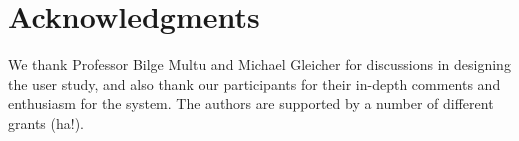 \documentclass{sigchi}
\begin{document}
\section{Acknowledgments}

We thank Professor Bilge Multu and Michael Gleicher for discussions in designing the user study, and also thank our participants for their in-depth comments and enthusiasm for the system.  The authors are supported by a number of different grants (ha!).

%
%
%
%
%
\balance



\end{document}
